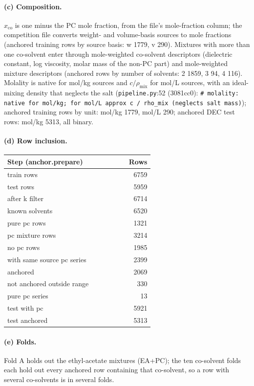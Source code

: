 \paragraph{(c) Composition.} $x_{\mathrm{co}}$ is one minus the PC mole fraction, from the file's mole-fraction column; the competition file converts weight- and volume-basis sources to mole fractions (anchored training rows by source basis: w 1779, v 290). Mixtures with more than one co-solvent enter through mole-weighted co-solvent descriptors (dielectric constant, log viscosity, molar mass of the non-PC part) and mole-weighted mixture descriptors (anchored rows by number of solvents: 2 1859, 3 94, 4 116). Molality is native for mol/kg sources and $c/\rho_{\mathrm{mix}}$ for mol/L sources, with an ideal-mixing density that neglects the salt (\texttt{pipeline.py}:52 (3081cc0): \texttt{\# molality: native for mol/\allowbreak{}kg; for mol/\allowbreak{}L approx c /\allowbreak{} rho\_\allowbreak{}mix (neglects salt mass)}); anchored training rows by unit: mol/kg 1779, mol/L 290; anchored DEC test rows: mol/kg 5313, all binary.

\paragraph{(d) Row inclusion.}

{\footnotesize\setlength{\tabcolsep}{3pt}
\begin{longtable}{R{0.6\linewidth} r}
\toprule
Step (anchor.prepare) & Rows \\
\midrule
\endhead
train rows & 6759 \\
test rows & 5959 \\
after k filter & 6714 \\
known solvents & 6520 \\
pure pc rows & 1321 \\
pc mixture rows & 3214 \\
no pc rows & 1985 \\
with same source pc series & 2399 \\
anchored & 2069 \\
not anchored outside range & 330 \\
pure pc series & 13 \\
test with pc & 5921 \\
test anchored & 5313 \\
\bottomrule
\end{longtable}}
\paragraph{(e) Folds.} Fold A holds out the ethyl-acetate mixtures (EA+PC); the ten co-solvent folds each hold out every anchored row containing that co-solvent, so a row with several co-solvents is in several folds.

